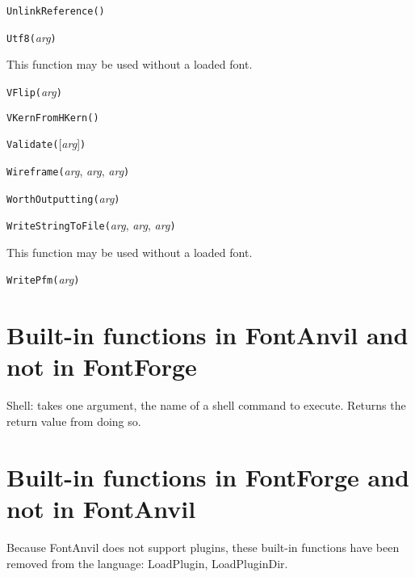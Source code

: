 \noindent\texttt{UnlinkReference(}\texttt{)}


\noindent\texttt{Utf8(}\textit{arg}\texttt{)}

This function may be used without a loaded font.


\noindent\texttt{VFlip(}\textit{arg}\texttt{)}


\noindent\texttt{VKernFromHKern(}\texttt{)}


\noindent\texttt{Validate(}[\textit{arg}]\texttt{)}


\noindent\texttt{Wireframe(}\textit{arg}, \textit{arg}, \textit{arg}\texttt{)}


\noindent\texttt{WorthOutputting(}\textit{arg}\texttt{)}


\noindent\texttt{WriteStringToFile(}\textit{arg}, \textit{arg}, \textit{arg}\texttt{)}

This function may be used without a loaded font.


\noindent\texttt{WritePfm(}\textit{arg}\texttt{)}


\section{Built-in functions in FontAnvil and not in FontForge}


Shell:  \FFdiff takes
one argument, the name of a shell command to execute.  Returns
the return value from doing so.

\section{Built-in functions in FontForge and not in FontAnvil}

Because \FFdiff FontAnvil does not support plugins, these built-in functions have
been removed from the language:  LoadPlugin, LoadPluginDir.

